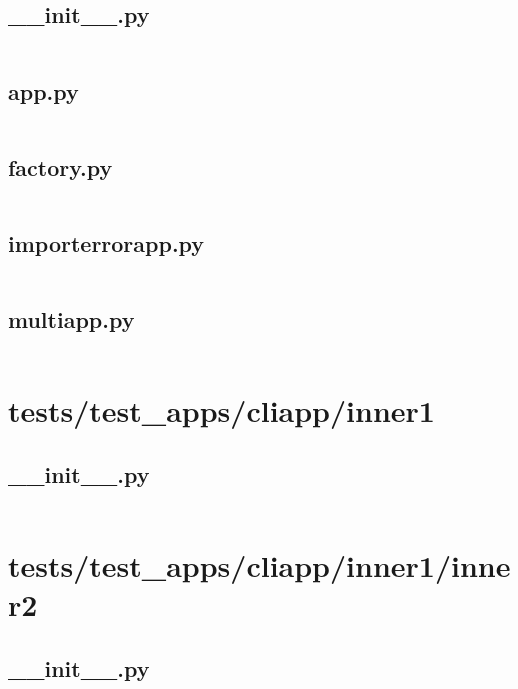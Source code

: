\documentclass{article}
\begin{document}
\subsection{\_\_init\_\_.py}
\inputminted{python}{/tmp/flask/tests/test_apps/cliapp/__init__.py}
\newpage

\subsection{app.py}
\inputminted{python}{/tmp/flask/tests/test_apps/cliapp/app.py}
\newpage

\subsection{factory.py}
\inputminted{python}{/tmp/flask/tests/test_apps/cliapp/factory.py}
\newpage

\subsection{importerrorapp.py}
\inputminted{python}{/tmp/flask/tests/test_apps/cliapp/importerrorapp.py}
\newpage

\subsection{multiapp.py}
\inputminted{python}{/tmp/flask/tests/test_apps/cliapp/multiapp.py}
\newpage

\section{tests/test\_apps/cliapp/inner1}

\subsection{\_\_init\_\_.py}
\inputminted{python}{/tmp/flask/tests/test_apps/cliapp/inner1/__init__.py}
\newpage

\section{tests/test\_apps/cliapp/inner1/inner2}

\subsection{\_\_init\_\_.py}
\inputminted{python}{/tmp/flask/tests/test_apps/cliapp/inner1/inner2/__init__.py}
\newpage
\end{document}

